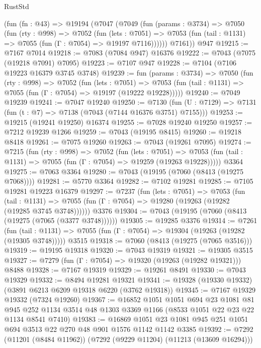 \begin{lexlean}{RustStd}
\begin{coremodule}
    (fun (fn : @43) =>
    @19194
      (@7047
        (@7049
          (fun (params : @3734) =>
          @7050
            (fun (rty : @998) =>
            @7052
              (fun (lets : @7051) =>
              @7053 (fun (tail : @1131) => @7055 (fun (Γ : @7054) => @19197 @7116))))))
        @7161))
    @947
@19215 := @7167 @7014
@19218 := @7083 (@7084 @947) @16376
@19222 := @7043 (@7075 (@19218 @7091) @7095)
@19223 := @7107 @947
@19228 := @7104 (@7106 @19223 @16379 @3745 @3748)
@19239 := fun (params : @3734) =>
  @7050
    (fun (rty : @998) =>
    @7052
      (fun (lets : @7051) =>
      @7053 (fun (tail : @1131) => @7055 (fun (Γ : @7054) => @19197 (@19222 @19228)))))
@19240 := @7049 @19239
@19241 := @7047 @19240
@19250 := @7130
    (fun (U : @7129) => @7131 (fun (t : @7) => @7138 (@7043 (@7144 @16376 @3751) @7155)))
@19253 := @19215 (@19241 @19250) @16374
@19255 := @7028 @19240 @19250
@19257 := @7212 @19239 @1266
@19259 := @7043 (@19195 @8415)
@19260 := @19218 @8418
@19261 := @7075 @19260
@19263 := @7043 (@19261 @7095)
@19274 := @7215
    (fun (rty : @998) =>
    @7052
      (fun (lets : @7051) =>
      @7053 (fun (tail : @1131) => @7055 (fun (Γ : @7054) => @19259 (@19263 @19228)))))
    @3364
@19275 := @7063 @3364
@19280 := @7043 (@19195 (@7060 (@8413 (@19275 @7068))))
@19281 := @5770 @3364
@19282 := @7102 @19281
@19285 := @7105 @19281 @19223 @16379
@19297 := @7237
    (fun (lets : @7051) =>
    @7053
      (fun (tail : @1131) =>
      @7055 (fun (Γ : @7054) => @19280 (@19263 (@19282 (@19285 @3745 @3748))))))
    @3376
@19304 := @7043 (@19195 (@7060 (@8413 (@19275 (@7065 (@3377 @3748))))))
@19305 := @19285 @3376
@19314 := @7261
    (fun (tail : @1131) => @7055 (fun (Γ : @7054) => @19304 (@19263 (@19282 (@19305 @3748)))))
    @3515
@19318 := @7060 (@8413 (@19275 (@7065 @3516)))
@19319 := @19195 @19318
@19320 := @7043 @19319
@19321 := @19305 @3515
@19327 := @7279 (fun (Γ : @7054) => @19320 (@19263 (@19282 @19321))) @8488
@19328 := @7167 @19319
@19329 := @19261 @8491
@19330 := @7043 @19329
@19332 := @8494 @19281 @19321
@19341 := @19328 (@19330 @19332) (@3891 @6213 @6209 @19318 @6220 (@3762 @19318))
@19345 := @7167 @19329 @19332 (@7324 @19260)
@19367 := @16852
    @1051
    @1051
    @694
    @23
    @1081
    @81
    @945
    @252
    @1134
    @3514
    @48
    @1303
    @3369
    @1166
    (@8533 @1051 @22 @23 @22 @1134 @8541 @7410)
@19383 := @16869
    @1051
    @23
    @1081
    @945
    @251
    @1051
    @694
    @3513
    @22
    @270
    @48
    @901
    @1576
    @1142
    @1142
    @3385
@19392 := @7292 (@11201 (@8484 @11962)) (@7292 (@9229 @11204) (@11213 (@13609 @16294)))

\end{coremodule}
\end{lexlean}
